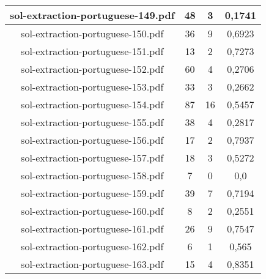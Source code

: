 \documentclass[11pt]{article}
\newlength\mylength
\begin{document}
\begin{center}
\begin{longtable}{||C{.40\mylength}||C{.30\mylength}||C{.30\mylength}||C{.30\mylength}||}
  sol-extraction-portuguese-149.pdf & 48 & 3 & 0,1741 \\  \hline
  sol-extraction-portuguese-150.pdf & 36 & 9 & 0,6923 \\  \hline
  sol-extraction-portuguese-151.pdf & 13 & 2 & 0,7273 \\  \hline
  sol-extraction-portuguese-152.pdf & 60 & 4 & 0,2706 \\  \hline
  sol-extraction-portuguese-153.pdf & 33 & 3 & 0,2662 \\  \hline
  sol-extraction-portuguese-154.pdf & 87 & 16 & 0,5457 \\  \hline
  sol-extraction-portuguese-155.pdf & 38 & 4 & 0,2817 \\  \hline
  sol-extraction-portuguese-156.pdf & 17 & 2 & 0,7937 \\  \hline
  sol-extraction-portuguese-157.pdf & 18 & 3 & 0,5272 \\  \hline
  sol-extraction-portuguese-158.pdf & 7 & 0 & 0,0 \\  \hline
  sol-extraction-portuguese-159.pdf & 39 & 7 & 0,7194 \\  \hline
  sol-extraction-portuguese-160.pdf & 8 & 2 & 0,2551 \\  \hline
  sol-extraction-portuguese-161.pdf & 26 & 9 & 0,7547 \\  \hline
  sol-extraction-portuguese-162.pdf & 6 & 1 & 0,565 \\  \hline
  sol-extraction-portuguese-163.pdf & 15 & 4 & 0,8351 \\  \hline

\end{longtable}
\end{center}
\end{document}
